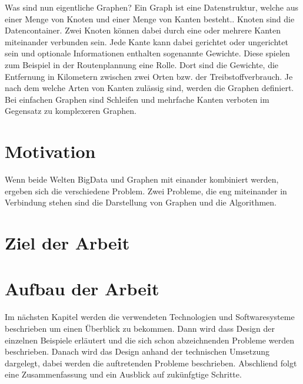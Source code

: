 Was sind nun eigentliche Graphen? Ein Graph ist eine Datenstruktur, welche aus
einer Menge von Knoten und einer Menge von Kanten besteht.. Knoten sind die
Datencontainer. Zwei Knoten können dabei durch eine oder mehrere Kanten miteinander
verbunden sein. Jede Kante kann dabei gerichtet oder ungerichtet sein und
optionale Informationen enthalten sogenannte Gewichte. Diese spielen zum Beispiel
in der Routenplannung eine Rolle. Dort sind die Gewichte, die Entfernung in
Kilometern zwischen zwei Orten bzw. der Treibstoffverbrauch. Je nach dem welche
Arten von Kanten zulässig sind, werden die Graphen definiert. Bei einfachen
Graphen sind Schleifen und mehrfache Kanten verboten im Gegensatz zu komplexeren
Graphen.

\section{Motivation}
Wenn beide Welten BigData und Graphen mit einander kombiniert werden, ergeben
sich die verschiedene Problem. Zwei Probleme, die eng miteinander in Verbindung
stehen sind die Darstellung von Graphen und die Algorithmen.


\section{Ziel der Arbeit}

\section{Aufbau der Arbeit}
Im nächsten Kapitel werden die verwendeten Technologien und Softwaresysteme
beschrieben um einen Überblick zu bekommen. Dann wird dass Design der einzelnen
Beispiele erläutert und die sich schon abzeichnenden Probleme werden beschrieben.
Danach wird das Design anhand der technischen Umsetzung dargelegt, dabei werden
die auftretenden Probleme beschrieben. Abschliend folgt eine Zusammenfassung und
ein Ausblick auf zukünfgtige Schritte.
